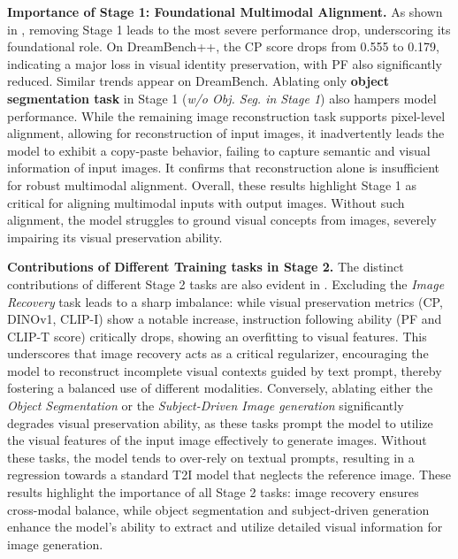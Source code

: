 \textbf{Importance of Stage 1: Foundational Multimodal Alignment.} \label{abl:stage1}
As shown in , removing Stage 1 leads to the most severe performance drop, underscoring its foundational role. On DreamBench++, the CP score drops from 0.555 to 0.179, indicating a major loss in visual identity preservation, with PF also significantly reduced. Similar trends appear on DreamBench.
Ablating only \textbf{object segmentation task} in Stage 1 (\textit{w/o Obj. Seg. in Stage 1}) also hampers model performance.
While the remaining image reconstruction task supports pixel-level alignment, allowing for reconstruction of input images, it inadvertently leads the model to exhibit a copy-paste behavior, failing to capture semantic and visual information of input images. It confirms that reconstruction alone is insufficient for robust multimodal alignment.
Overall, these results highlight Stage 1 as critical for aligning multimodal inputs with output images.
Without such alignment, the model struggles to ground visual concepts from images, severely impairing its visual preservation ability.


\textbf{Contributions of Different Training tasks in Stage 2.} \label{abl:stage2} 
The distinct contributions of different Stage 2 tasks are also evident in .
Excluding the \textit{Image Recovery} task leads to a sharp imbalance: while visual preservation metrics (CP, DINOv1, CLIP-I) show a notable increase, instruction following ability (PF and CLIP-T score) critically drops, showing an overfitting to visual features. This underscores that image recovery acts as a critical regularizer, encouraging the model to reconstruct incomplete visual contexts guided by text prompt, thereby fostering a balanced use of different modalities.
Conversely, ablating either the \textit{Object Segmentation} or the \textit{Subject-Driven Image generation} significantly degrades visual preservation ability, as these tasks prompt the model to utilize the visual features of the input image effectively to generate images.
Without these tasks, the model tends to over-rely on textual prompts, resulting in a regression towards a standard T2I model that neglects the reference image. 
These results highlight the importance of all Stage 2 tasks: image recovery ensures cross-modal balance, while object segmentation and subject-driven generation enhance the model’s ability to extract and utilize detailed visual information for image generation.

